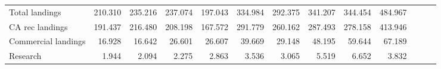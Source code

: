\documentclass[11pt,
  english,
  a4paper,
]{article}
\begin{document}
\begin{table}[H]
{\begin{tabular}[t]{lrrrrrrrrrrrr}
\hspace{1em}Total landings & 210.310 & 235.216 & 237.074 & 197.043 & 334.984 & 292.375 & 341.207 & 344.454 & 484.967 &  &  & \\
\hspace{1em}CA rec landings & 191.437 & 216.480 & 208.198 & 167.572 & 291.779 & 260.162 & 287.493 & 278.158 & 413.946 &  &  & \\
\hspace{1em}Commercial landings & 16.928 & 16.642 & 26.601 & 26.607 & 39.669 & 29.148 & 48.195 & 59.644 & 67.189 &  &  & \\
\hspace{1em}Research & 1.944 & 2.094 & 2.275 & 2.863 & 3.536 & 3.065 & 5.519 & 6.652 & 3.832 &  &  & \\
\bottomrule
\end{tabular}}
\end{table}
\end{document}

